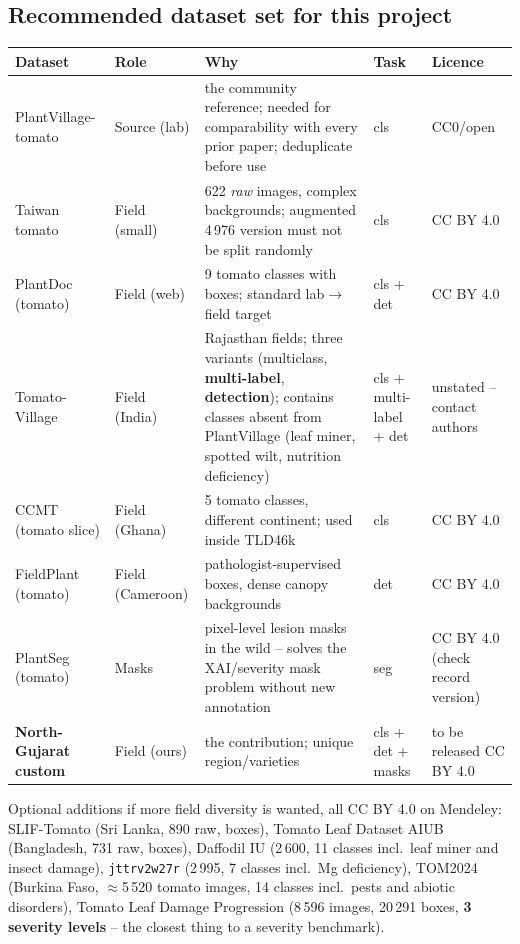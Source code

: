 \subsection{Recommended dataset set for this project}
\begin{center}\small
\begin{tabular}{@{}L{2.6cm}L{1.5cm}L{5.0cm}L{2.4cm}L{3.6cm}@{}}
\toprule
Dataset & Role & Why & Task & Licence \\
\midrule
PlantVillage-tomato & Source (lab) & the community reference; needed for comparability with every prior paper; deduplicate before use & cls & CC0/open \\
Taiwan tomato & Field (small) & 622 \emph{raw} images, complex backgrounds; augmented 4\,976 version must not be split randomly & cls & CC BY 4.0 \\
PlantDoc (tomato) & Field (web) & 9 tomato classes with boxes; standard lab$\to$field target & cls + det & CC BY 4.0 \\
Tomato-Village & Field (India) & Rajasthan fields; three variants (multiclass, \textbf{multi-label}, \textbf{detection}); contains classes absent from PlantVillage (leaf miner, spotted wilt, nutrition deficiency) & cls + multi-label + det & unstated -- contact authors \\
CCMT (tomato slice) & Field (Ghana) & 5 tomato classes, different continent; used inside TLD46k & cls & CC BY 4.0 \\
FieldPlant (tomato) & Field (Cameroon) & pathologist-supervised boxes, dense canopy backgrounds & det & CC BY 4.0 \\
PlantSeg (tomato) & Masks & pixel-level lesion masks in the wild -- solves the XAI/severity mask problem without new annotation & seg & CC BY 4.0 (check record version) \\
\textbf{North-Gujarat custom} & Field (ours) & the contribution; unique region/varieties & cls + det + masks & to be released CC BY 4.0 \\
\bottomrule
\end{tabular}
\end{center}
Optional additions if more field diversity is wanted, all CC BY 4.0 on Mendeley: SLIF-Tomato (Sri Lanka, 890 raw, boxes), Tomato Leaf Dataset AIUB (Bangladesh, 731 raw, boxes), Daffodil IU (2\,600, 11 classes incl.\ leaf miner and insect damage), \texttt{jttrv2w27r} (2\,995, 7 classes incl.\ Mg deficiency), TOM2024 (Burkina Faso, $\approx$5\,520 tomato images, 14 classes incl.\ pests and abiotic disorders), Tomato Leaf Damage Progression (8\,596 images, 20\,291 boxes, \textbf{3 severity levels} -- the closest thing to a severity benchmark).

